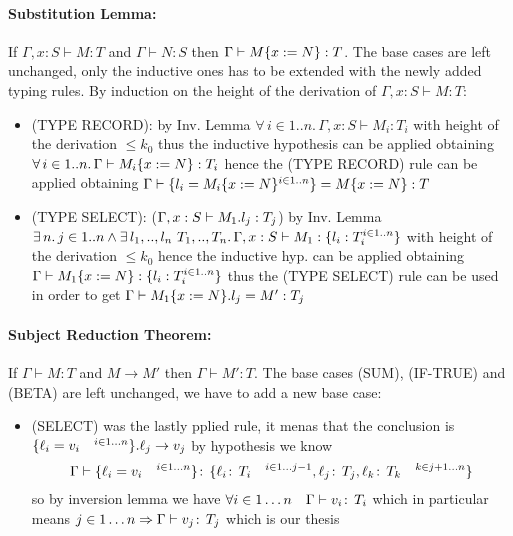 \paragraph*{Substitution Lemma:\\}
If \(\Gamma, x: S \vdash M: T\) and \(\Gamma \vdash N: S\) then \(\Gamma
\vdash M\{x:=N\}: T\).  The base cases are left unchanged, only the
inductive ones has to be extended with the newly added typing rules.
By induction on the height of the derivation of \(\Gamma, x: S \vdash
M: T\):
\begin{itemize}
\item (TYPE RECORD): by Inv. Lemma \(\forall\, i \in 1..n.\, \Gamma,
  x: S \vdash M_i: T_i\) with height of the derivation \(\le k_0\)
  thus the inductive hypothesis can be applied obtaining\\ \(\forall\,
  i \in 1..n.\, \Gamma \vdash M_i\{x:=N\}: T_i\) hence the (TYPE
  RECORD) rule can be applied obtaining \(\Gamma \vdash
  \{l_i=M_i\{x:=N\}^{i \in 1..n}\}= M\{x:=N\}: T\)
\item (TYPE SELECT): (\(\Gamma, x: S \vdash M_1.l_j: T_j\)) by
  Inv. Lemma\\ \(\exists\, n.\, j \in 1..n \wedge \exists\,
  l_1,..,l_n\ T_1,..,T_n.\, \Gamma, x: S \vdash M_1 : \{l_i:
    T_i^{i \in 1..n}\}\) with height of the derivation \(\le k_0\)
  hence the inductive hyp. can be applied obtaining \(\Gamma \vdash
  M_1\{x:=N\} : \{l_i: T_i^{i \in 1..n}\}\) thus the (TYPE
  SELECT) rule can be used in order to get \(\Gamma \vdash
  M_1\{x:=N\}.l_j = M': T_j\)
\end{itemize}


\paragraph*{Subject Reduction Theorem:\\}

If \(\Gamma \vdash M: T\) and \(M \to M'\) then \(\Gamma \vdash M':
T\).  The base cases (SUM), (IF-TRUE) and (BETA) are left unchanged,
we have to add a new base case:
\begin{itemize}
\item (SELECT) was the lastly pplied rule, it menas that the
  conclusion is \(\{\ell_i = v_i \quad^{i\in 1\dots n}\}.\ell_j \to
  v_j\) by hypothesis we know \[\Gamma \vdash \{\ell_i = v_i
    \quad^{i\in 1\dots n}\} \!:\,\{\ell_i \!:\,T_i \quad^{i\in
        1\dots j-1}, \ell_j \!:\,T_j, \ell_k \!:\,T_k \quad^{k\in
        j+1\dots n}\}\] so by inversion lemma we have \(\forall i \in
  1 \dots n \quad \Gamma\vdash v_i\!:\,T_i\) which in particular
  means \(j\in 1\dots n \Rightarrow \Gamma \vdash v_j \!:\,T_j\)
  which is our thesis
\end{itemize}

